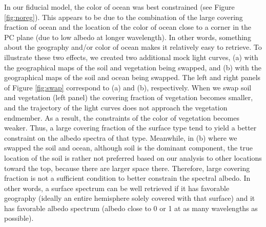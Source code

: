 \documentclass[iop,numberedappendix,apj,]{emulateapj}
\begin{document}
In our fiducial model, the color of ocean was best constrained (see Figure \ref{fig:noreg}). 
%
This appears to be due to the combination of the large covering fraction of ocean and the location of the color of ocean close to a corner in the PC plane (due to low albedo at longer wavelength). 
In other words, something about the geography and/or color of ocean makes it relatively easy to retrieve. 
To illustrate these two effects, we created two additional mock light curves, (a) with the geographical maps of the soil and vegetation being swapped, and  (b) with the geographical maps of the soil and ocean being swapped. 
The left and right panels of Figure \ref{fig:swap} correspond to (a) and (b), respectively. 
%
When we swap soil and vegetation (left panel) the covering fraction of vegetation becomes smaller, and the trajectory of the light curves does not approach the vegetation endmember. As a result, the constraints of the color of vegetation becomes weaker. Thus, a large covering fraction of the surface type tend to yield a better constraint on the albedo spectra of that type. 
%
Meanwhile, in (b) where we swapped the soil and ocean, although soil is the dominant component, the true location of the soil is rather not preferred based on our analysis to other locations toward the top, because there are larger space there. 
Therefore, large covering fraction is not a sufficient condition to better constrain the spectral albedo. 
In other words, a surface spectrum can be well retrieved if it has favorable geography (ideally an entire hemisphere solely covered with that surface) and it has favorable albedo spectrum (albedo close to 0 or 1 at as many wavelengths as possible). 
\end{document}
